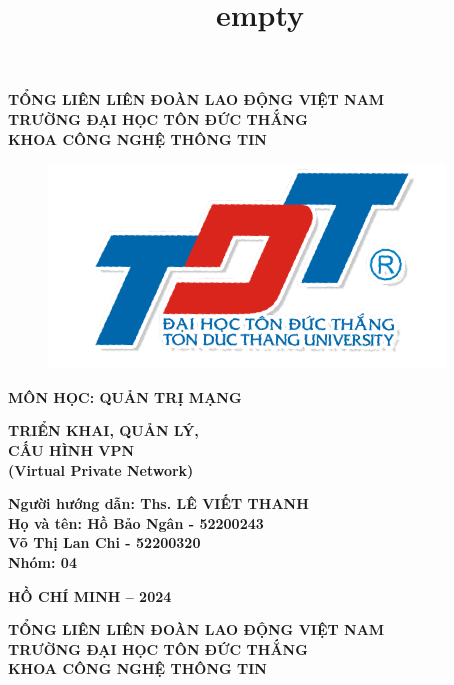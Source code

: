 \documentclass[13pt]{report}
\title{empty}
\begin{document}
	\fontsize{15pt}{15pt}\selectfont
	\begin{center}
		\textbf{TỔNG LIÊN LIÊN ĐOÀN LAO ĐỘNG VIỆT NAM \\TRƯỜNG ĐẠI HỌC TÔN ĐỨC THẮNG\\ KHOA CÔNG NGHỆ THÔNG TIN}\\
	\end{center}
	\vspace{1cm}
	\begin{figure}[h]
		\centering
		\includegraphics[width=0.3\linewidth]{img/Logo.png}
	\end{figure}	
	\fontsize{18pt}{18pt}\selectfont
	\begin{center}
		\textbf{MÔN HỌC: QUẢN TRỊ MẠNG}
	\end{center}
	\vspace{1cm}
	\fontsize{18pt}{16pt}\selectfont
	\begin{center}\Huge
		\textbf{TRIỂN KHAI, QUẢN LÝ, \\CẤU HÌNH VPN \\(Virtual Private Network)}	
	\end{center}
    \vspace{2cm}
    \fontsize{16pt}{16pt}\selectfont
    \begin{flushright}
        \textbf{Người hướng dẫn: Ths. LÊ VIẾT THANH\\ Họ và tên: Hồ Bảo Ngân - 52200243 \\ Võ Thị Lan Chi - 52200320\\Nhóm: 04}
    \end{flushright}
	\vspace{2cm}
	\begin{center}
		\textbf{HỒ CHÍ MINH – 2024}
	\end{center}
    \newpage
    \thispagestyle{empty}
    \fontsize{15pt}{15pt}\selectfont
	\begin{center}
		\textbf{TỔNG LIÊN LIÊN ĐOÀN LAO ĐỘNG VIỆT NAM \\TRƯỜNG ĐẠI HỌC TÔN ĐỨC THẮNG\\ KHOA CÔNG NGHỆ THÔNG TIN}\\
	\end{center}
\end{document}

